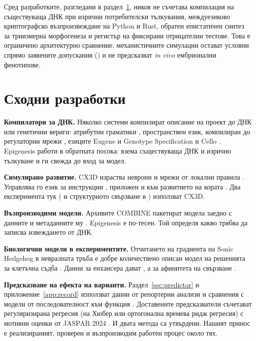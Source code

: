 \documentclass[10.5pt,a4paper]{article}
\begin{document}
Сред разработките, разгледани в раздел~\ref{sec:related}, никоя не съчетава компилация на съществуваща ДНК при изрични потребителски тълкувания, междуезиково криптографско възпроизвеждане на Python и Rust, обратен епистатичен синтез за триизмерна морфогенеза и регистър на фиксирани отрицателни тестове. Това е ограничено архитектурно сравнение; механистичните симулации остават условни спрямо заявените допускания () и не предсказват \emph{in vivo} ембрионални фенотипове.

\section{Сходни разработки}\label{sec:related}

\textbf{Компилатори за ДНК.} Няколко системи компилират описание на проект до ДНК или генетични вериги: атрибутни граматики \citep{cai2009}, пространствен език, компилиран до регулаторни мрежи \citep{beal2011}, езиците Eugene и Genotype Specification \citep{bilitchenko2011,wilson2016} и Cello \citep{nielsen2016}. Epigenesis работи в обратната посока: взема съществуваща ДНК и изрично тълкуване и ги свежда до вход за модел.

\textbf{Симулирано развитие.} CX3D израства неврони и мрежи от локални правила \citep{zubler2009}. Управлява го език за инструкции \citep{zubler2011}, приложен и към развитието на кората \citep{zubler2013}. Два експеримента тук ( и структурното свързване в ) използват CX3D.

\textbf{Възпроизводими модели.} Архивите COMBINE пакетират модела заедно с данните и метаданните му \citep{bergmann2014}. Epigenesis е по-тесен. Той определя какво трябва да записва извеждането от ДНК.

\textbf{Биологични модели в експериментите.} Отчитането на градиента на Sonic Hedgehog в невралната тръба е добре количествено описан модел на решенията за клетъчна съдба \citep{balaskas2012,cohen2014,herreradelgado2020}. Данни за енхансера дават \citet{peterson2012}, а за афинитета на свързване \citet{hallikas2006}.

\textbf{Предсказване на ефекта на варианти.} Раздел~\ref{sec:predictor} и приложение~\ref{app:record} използват данни от репортерни анализи \citep{melnikov2012,tewhey2016,kircher2019,kreimer2022} и сравнения с модели от последователност към функция \citep{zhou2015,kelley2016,kelley2018,avsec2021,chen2022}. Доставените предсказватели съчетават регуляризирана регресия (на Хюбер \citealt{huber1964} или ортогонална времева ридж регресия) с мотивни оценки от JASPAR 2024 \citep{rauluseviciute2024}. И двата метода са утвърдени. Нашият принос е реализираният, проверен и възпроизводим работен процес около тях.
\end{document}
